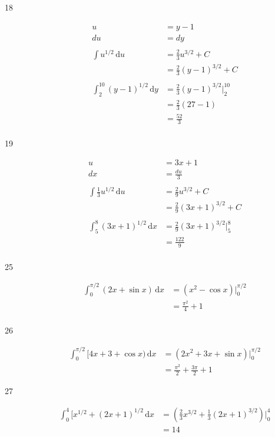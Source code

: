 \documentclass{exam}
\begin{document}
\begin{description}
\item[18]

\begin{align*}
  u &= y - 1 \\
  du &= dy \\
\\
  \int u^{1/2} \, \mathrm{d}u &= \frac{2}{3} u^{3/2} + C \\
  &= \frac{2}{3} (y - 1)^{3/2} + C \\
\\
  \int_{2}^{10} (y - 1)^{1/2} \, \mathrm{d}y &= \frac{2}{3} (y - 1)^{3/2} \bigg|_2^{10} \\
  &= \frac{2}{3} (27 - 1)  \\
  &= \frac{52}{3} \\
\end{align*}

\item[19]

\begin{align*}
  u &= 3x + 1 \\
  dx &= \frac{du}{3} \\
\\
  \int \frac{1}{3} u^{1/2} \, \mathrm{d}u &= \frac{2}{9} u^{3/2} + C \\
  &= \frac{2}{9} (3x + 1)^{3/2} + C \\
\\
  \int_5^8 (3x + 1)^{1/2} \, \mathrm{d}x &= \frac{2}{9} (3x + 1)^{3/2} \bigg|_5^8 \\
  &= \frac{122}{9} \\
\end{align*}

\item[25]
\begin{align*}
  \int_0^{\pi/2} (2x + \sin x) \, \mathrm{d}x &= (x^2 - \cos x) \bigg|_0^{\pi/2} \\
  &= \frac{\pi^2}{4} + 1 \\
\end{align*}

\item[26]
\begin{align*}
  \int_0^{\pi/2} [ 4x + 3 + \cos x) \, \mathrm{d}x &= ( 2x^2 + 3x + \sin x) \bigg|_0^{\pi/2} \\
  &= \frac{\pi^2}{2} + \frac{3 \pi}{2} + 1
\end{align*}

\item[27]
\begin{align*}
  \int_0^4 [x^{1/2} + (2x + 1)^{1/2} \, \mathrm{d}x &= \left( \frac{2}{3} x^{3/2} + \frac{1}{3} (2x + 1)^{3/2} \right) \bigg|_0^4 \\
  &= 14 \\
\end{align*}


\end{description}
\end{document}
